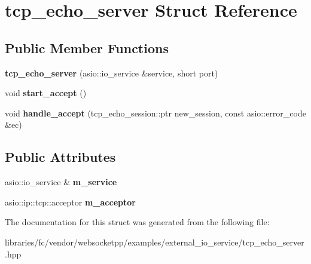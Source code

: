 \hypertarget{structtcp__echo__server}{}\section{tcp\+\_\+echo\+\_\+server Struct Reference}
\label{structtcp__echo__server}
\subsection*{Public Member Functions}
\begin{DoxyCompactItemize}
\item 
\mbox{\label{structtcp__echo__server_a20bcbc728243d24b258bc44dce10ba43}} 
{\bfseries tcp\+\_\+echo\+\_\+server} (asio\+::io\+\_\+service \&service, short port)
\item 
\mbox{\label{structtcp__echo__server_aba350094250187e9e05031512d2db771}} 
void {\bfseries start\+\_\+accept} ()
\item 
\mbox{\label{structtcp__echo__server_aada379cda78e40871a7e2d96536a8b68}} 
void {\bfseries handle\+\_\+accept} (tcp\+\_\+echo\+\_\+session\+::ptr new\+\_\+session, const asio\+::error\+\_\+code \&ec)
\end{DoxyCompactItemize}
\subsection*{Public Attributes}
\begin{DoxyCompactItemize}
\item 
\mbox{\label{structtcp__echo__server_ad58d0d47a8eca9406a0724bb07de3f7f}} 
asio\+::io\+\_\+service \& {\bfseries m\+\_\+service}
\item 
\mbox{\label{structtcp__echo__server_a0d7f86ad066b6c16bdb61999ffb8c340}} 
asio\+::ip\+::tcp\+::acceptor {\bfseries m\+\_\+acceptor}
\end{DoxyCompactItemize}


The documentation for this struct was generated from the following file\+:\begin{DoxyCompactItemize}
\item 
libraries/fc/vendor/websocketpp/examples/external\+\_\+io\+\_\+service/tcp\+\_\+echo\+\_\+server.\+hpp\end{DoxyCompactItemize}
